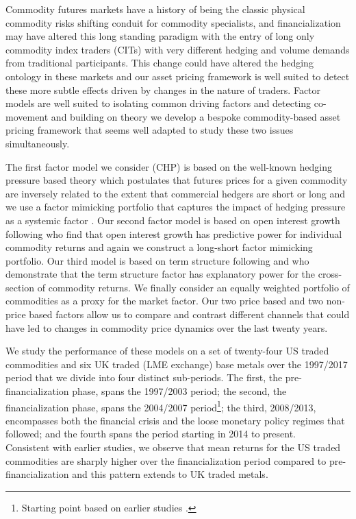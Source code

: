 \documentclass[12pt,]{article}
\let\rmarkdownfootnote\footnote%
\def\footnote{\protect\rmarkdownfootnote}
\begin{document}
Commodity futures markets have a history of being the classic physical
commodity risks shifting conduit for commodity specialists, and
financialization may have altered this long standing paradigm with the
entry of long only commodity index traders (CITs) with very different
hedging and volume demands from traditional participants. This change
could have altered the hedging ontology in these markets and our asset
pricing framework is well suited to detect these more subtle effects
driven by changes in the nature of traders. Factor models are well
suited to isolating common driving factors and detecting co-movement and
building on theory we develop a bespoke commodity-based asset pricing
framework that seems well adapted to study these two issues
simultaneously.

The first factor model we consider (CHP) is based on the well-known
hedging pressure based theory
\citep{anderson_hedger_1983, chang_returns_1985, cootner_returns_1960, dusak_futures_1973, hicks_value_1939, hirshleifer_risk_1988, hirshleifer_determinants_1989, hirshleifer_hedging_1990, kolb_is_1992, keynes_treatise_1930}
which postulates that futures prices for a given commodity are inversely
related to the extent that commercial hedgers are short or long and we
use a factor mimicking portfolio that captures the impact of hedging
pressure as a systemic factor \citep{basu_capturing_2013}. Our second
factor model is based on open interest growth following
\citet{hong_what_2012} who find that open interest growth has predictive
power for individual commodity returns and again we construct a
long-short factor mimicking portfolio. Our third model is based on term
structure following \citet{szymanowska_anatomy_2014} and
\citet{fuertes_commodity_2015} who demonstrate that the term structure
factor has explanatory power for the cross-section of commodity returns.
We finally consider an equally weighted portfolio of commodities as a
proxy for the market factor. Our two price based and two non-price based
factors allow us to compare and contrast different channels that could
have led to changes in commodity price dynamics over the last twenty
years.

We study the performance of these models on a set of twenty-four US
traded commodities and six UK traded (LME exchange) base metals over the
1997/2017 period that we divide into four distinct sub-periods. The
first, the pre-financialization phase, spans the 1997/2003 period; the
second, the financialization phase, spans the 2004/2007 period\footnote{Starting
  point based on earlier studies
  \citep{baker_financialization_2014, christoffersen_factor_2018}.}; the
third, 2008/2013, encompasses both the financial crisis and the loose
monetary policy regimes that followed; and the fourth spans the period
starting in 2014 to present.\\
Consistent with earlier studies, we observe that mean returns for the US
traded commodities are sharply higher over the financialization period
compared to pre-financialization and this pattern extends to UK traded
metals.
\end{document}
